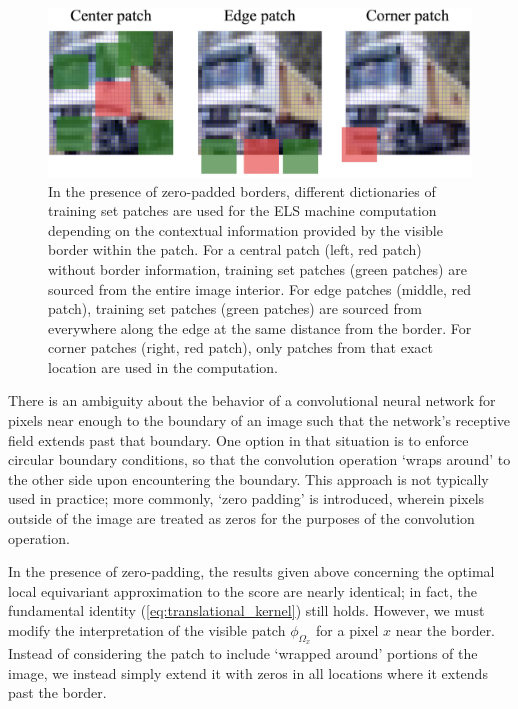 \documentclass{article}
\theoremstyle{plain}
\theoremstyle{definition}
\theoremstyle{remark}
\begin{document}
\begin{figure}[t]
    \centering
    \includegraphics[width=0.45\linewidth]{patch_locations2.png}
    \caption{In the presence of zero-padded borders, different dictionaries of training set patches are used for the ELS machine computation depending on the contextual information provided by the visible border within the patch. For a central patch (left, red patch) without border information, training set patches (green patches) are sourced from the entire image interior. For edge patches (middle, red patch), training set patches (green patches) are sourced from everywhere along the edge at the same distance from the border. For corner patches (right, red patch), only patches from that exact location are used in the computation. }
    \label{fig:border-regions}
\end{figure}

There is an ambiguity about the behavior of a convolutional neural network for pixels near enough to the boundary of an image such that the network's receptive field extends past that boundary. One option in that situation is to enforce circular boundary conditions, so that the convolution operation `wraps around' to the other side upon encountering the boundary. This approach is not typically used in practice; more commonly, `zero padding' is introduced, wherein pixels outside of the image are treated as zeros for the purposes of the convolution operation.

In the presence of zero-padding, the results given above concerning the optimal local equivariant approximation to the score are nearly identical; in fact, the fundamental identity (\ref{eq:translational_kernel}) still holds. However, we must modify the interpretation of the visible patch $\phi_{\Omega_x}$ for a pixel $x$ near the border. Instead of considering the patch to include `wrapped around' portions of the image, we instead simply extend it with zeros in all locations where it extends past the border. 
\end{document}
